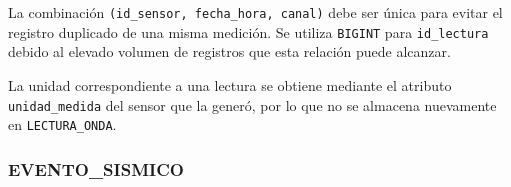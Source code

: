 \documentclass[12pt,a4paper]{article}
\begin{document}
La combinación \texttt{(id\_\allowbreak{}sensor, fecha\_\allowbreak{}hora, canal)} debe ser única para evitar el registro duplicado de una misma medición. Se utiliza \texttt{BIGINT} para \texttt{id\_\allowbreak{}lectura} debido al elevado volumen de registros que esta relación puede alcanzar.

La unidad correspondiente a una lectura se obtiene mediante el atributo \texttt{unidad\_\allowbreak{}medida} del sensor que la generó, por lo que no se almacena nuevamente en \texttt{LECTURA\_\allowbreak{}ONDA}.


\subsubsection*{EVENTO\_SISMICO}
\end{document}
